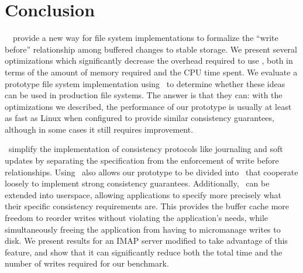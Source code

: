 \section{Conclusion}
\label{sec:conclusion}

\Kudos\ \patches\ provide a new way for file system implementations to formalize
the ``write before'' relationship among buffered changes to stable storage.
%
We present several optimizations which significantly decrease the overhead
required to use \patches, both in terms of the amount of memory required and the
CPU time spent.
%
We evaluate a prototype file system implementation using \patches\ to determine
whether these ideas can be used in production file systems.
%
The answer is that they can: with the optimizations we described, the
performance of our prototype is usually at least as fast as Linux when
configured to provide similar consistency guarantees, although in some cases it
still requires improvement.


\Patches\ simplify the implementation of consistency protocols like journaling
and soft updates by separating the specification from the enforcement of write
before relationships.
%
Using \patches\ also allows our prototype to be divided into \modules\ that
cooperate loosely to implement strong consistency guarantees.
%
Additionally, \patches\ can be extended into userspace, allowing applications to
specify more precisely what their specific consistency requirements are.
%
This provides the buffer cache more freedom to reorder writes without violating
the application's needs, while simultaneously freeing the application from
having to micromanage writes to disk.
%
We present results for an IMAP server modified to take advantage of this
feature, and show that it can significantly reduce both the total time and the
number of writes required for our benchmark.
